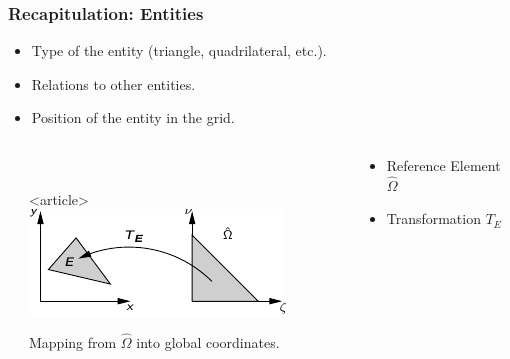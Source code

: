 \documentclass[aspectratio=169,11pt]{beamer}
\theoremstyle{definition}
\begin{document}
\begin{frame}
  \frametitle<presentation>{Recapitulation: Entities}

  \begin{itemize}
  \item Type of the entity (triangle, quadrilateral, etc.).
  \item Relations to other entities.
  \end{itemize}
  \begin{itemize}
  \item Position of the entity in the grid.
  \end{itemize}

  \begin{columns}
    \begin{column}{5mm}
    \end{column}
    \begin{column}{0.4\textwidth}
      \begin{center}
        \\
        \begin{onlyenv}<article>
          \includegraphics[width=0.6\linewidth]{refelem-mapping}\\
        \end{onlyenv}
        \centerline{\tiny Mapping from $\hat{\Omega}$ into global coordinates.}
      \end{center}
    \end{column}
    \begin{column}{0.5\textwidth}
        \begin{itemize}
        \item Reference Element $\hat{\Omega}$
        \item Transformation $T_E$
        \end{itemize}
    \end{column}
  \end{columns}


\end{frame}
\end{document}
